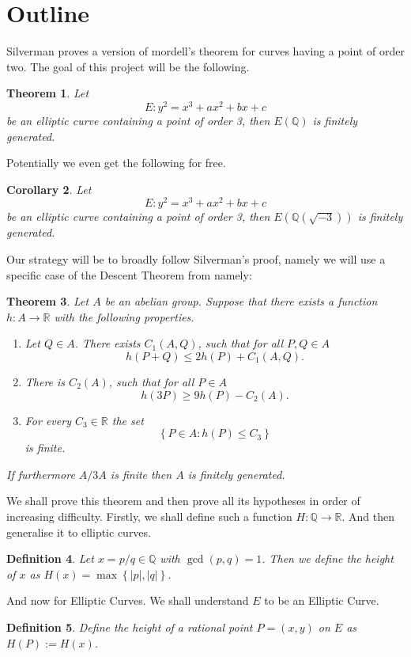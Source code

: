 \documentclass[11pt, oneside,a4paper]{article}
\title{\thecourse \theassignment}
\author{Levi Moes}
\newtheorem{theorem}{Theorem}[section]
\newtheorem{definition}[theorem]{Definition}
\newtheorem{corollary}[theorem]{Corollary}
\theoremstyle{definition}
\theoremstyle{remark}
\begin{document}
\section{Outline}
\label{sec:outline}
Silverman proves
a version of mordell's theorem for curves having a point of order
two.
The goal of this project will be the following.
\begin{theorem} \label{thm:goal}
  Let
  \[ E: y^2 = x^3 + ax^2 + bx + c \]
  be an elliptic curve containing a point of order 3,
  then $E(\mathbb{Q})$ is finitely generated.
\end{theorem}
Potentially we even get the following for free.
\begin{corollary} \label{cor:goalExtra}
  Let
  \[ E: y^2 = x^3 + ax^2 + bx + c \]
  be an elliptic curve containing a point of order 3,
  then $E(\mathbb{Q}(\sqrt{-3}))$ is finitely generated.
\end{corollary}
Our strategy will be to broadly follow Silverman's proof,
namely we will use a specific case of the Descent Theorem
from namely:
\begin{theorem} \label{thm:descentDraft}
  Let $A$ be an abelian group. Suppose
  that there exists a function $h: A \to \mathbb{R}$
  with the following properties.
  \begin{enumerate}
    \item Let $Q \in A$. There exists $C_1(A, Q)$, such that
      for all $P, Q \in A$
      \[ h(P + Q) \leq 2h(P) + C_1(A, Q). \]
    \item There is $C_2(A)$, such that
      for all $P \in A$
      \[ h(3P) \geq 9 h(P) - C_2(A). \]
    \item For every $C_3 \in \mathbb{R}$ the set
      \[ \left\{ P \in A : h(P) \leq C_3 \right\}  \]
      is finite.
  \end{enumerate}
  If furthermore $A/3A$ is finite
  then $A$ is finitely generated.
\end{theorem}
We shall prove this theorem and then prove all its
hypotheses in order of increasing difficulty.
Firstly, we shall define such a function $H: \mathbb{Q} \to \mathbb{R}$.
And then generalise it to elliptic curves.
\begin{definition} \label{def:heightFunctionRationals}
  Let $x = p/q \in \mathbb{Q}$ with $\gcd(p,q) = 1$.
  Then we define the height of $x$ as $H(x) = \max \left\{ |p|, |q| \right\}$.
\end{definition}
And now for Elliptic Curves. We shall understand $E$ to
be an Elliptic Curve.
\begin{definition} \label{def:heightFunctionEllipticCurves}
  Define the height of a rational point $P = (x,y)$ on $E$
  as $H(P) := H(x)$.
\end{definition}
\end{document}
